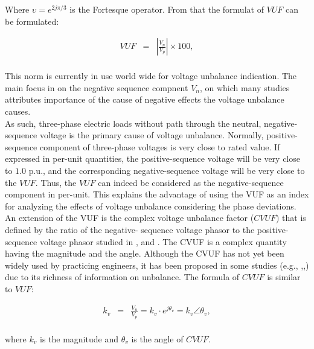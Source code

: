 	Where $\upsilon=e^{2j\pi/3}$ is the Fortesque operator. From that the formulat of $VUF$ can be formulated:
	
	
	\begin{equation}
        \begin{array}{rcl}
            VUF&=&\left|\frac{V_n}{V_p}\right|\times100,\\					
        \end{array}
        \label{BASICUNB:equ:VUF}
    \end{equation}
	
This norm is currently in use world wide for voltage unbalance indication. The main focus in on the negative sequence compnent $V_n$, on which many studies attributes importance of the cause of negative effects the voltage unbalance causes.\\
	As such, three-phase electric loads without path through the neutral, negative-sequence voltage is the primary cause of voltage unbalance. Normally, positive-sequence component of three-phase voltages is very close to rated value. If expressed in per-unit quantities, the positive-sequence voltage will be very close to $1.0$ p.u., and the corresponding negative-sequence voltage will be very close to the $VUF$. Thus, the $VUF$ can indeed be considered as the negative-sequence component in per-unit.	This explains the advantage of using the VUF as an index for analyzing the effects of voltage unbalance considering the phase deviations.
	An extension of the VUF is the complex voltage unbalance factor ($CVUF$) that is defined by the ratio of the negative-
sequence voltage phasor to the positive-sequence voltage phasor studied in \cite{wang2000analytical}, and \cite{pierrat1987unbalance}. The CVUF is a complex quantity having the magnitude and the angle. Although the CVUF has not yet been widely used by practicing engineers, it has been proposed in some studies (e.g., \cite{wang2001analysis},\cite{singh2007some},\cite{chen2013examination}) due to its richness of information on unbalance. The formula of $CVUF$ is similar to $VUF$:

\begin{equation}
        \begin{array}{rcl}
            k_v&=&\frac{V_n}{V_p}=k_v\cdot e^{j\theta_v}=k_v\angle\theta_v,\\					
        \end{array}
        \label{BASICUNB:equ:CVUF}
    \end{equation}
		
		where $k_v$ is the magnitude and $\theta_v$ is the angle of $CVUF$.
		
